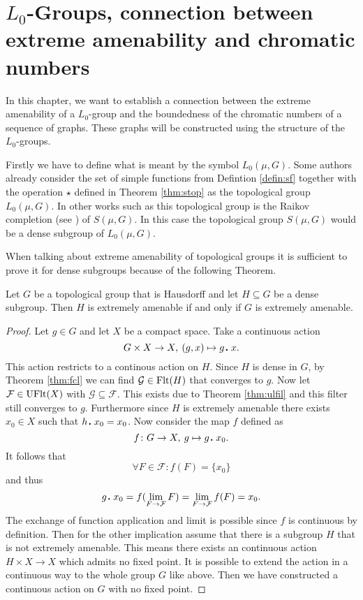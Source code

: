\section{$L_0$-Groups, connection between extreme amenability and chromatic numbers}\label{sec:l0groups}
In this chapter, we want to establish a connection between the extreme amenability of a $L_0$-group and the boundedness of the chromatic numbers of a sequence of graphs.
These graphs will be constructed using the structure of the $L_0$-groups.

Firstly we have to define what is meant by the symbol $L_0(\mu, G)$. Some authors already consider the set of simple functions from Defintion \ref{defin:sf} together with the operation $\star$ defined in Theorem \ref{thm:stop} as the topological group $L_0(\mu, G)$. In other works such as \cite{sl2024} this topological group is the Raikov completion (see \cite[Chapter 3.6]{atop2008}) of $S(\mu, G)$. In this case the topological group $S(\mu, G)$ would be a dense subgroup of $L_0(\mu, G)$.   

When talking about extreme amenability of topological groups it is sufficient to prove it for dense subgroups because of the following Theorem. 
\begin{thm}\label{thm:da}
  Let $G$ be a topological group that is Hausdorff and let $H \subseteq G$ be a dense subgroup. Then $H$ is extremely amenable if and only if $G$ is extremely amenable. 
\end{thm}

\begin{proof}
  Let $g \in G$ and let $X$ be a compact space. Take a continuous action \[G \times X \to X, \: (g, x) \mapsto g \anddot x.\] This action restricts to a continous action on $H$. Since $H$ is dense in $G$, by Theorem \ref{thm:fcl} we can find $\mathcal{G} \in {\rm Flt}(H)$ that converges to $g$. Now let $\mathcal{F} \in {\rm UFlt}(X)$ with $\mathcal{G} \subseteq \mathcal{F}$. This exists due to Theorem \ref{thm:ulfil} and this filter still converges to $g$. Furthermore since $H$ is extremely amenable there exists $x_0 \in X$ such that $h \anddot x_0 = x_0$. Now consider the map $f$ defined as \[f\colon G \to X, \: g \mapsto g\anddot x_0.\] It follows that \[\forall F\in \mathcal{F}\colon f(F) = \{x_0\}\] and thus \[g\anddot x_0 = f(\lim\limits_{F \to \mathcal{F}}F) = \lim\limits_{F\to \mathcal{F}} f(F) = x_0.\] The exchange of function application and limit is possible since $f$ is continuous by definition.
  Then for the other implication assume that there is a subgroup $H$ that is not extremely amenable. This means there exists an continuous action $H \times X \to X$ which admits no fixed point. It is possible to extend the action in a continuous way to the whole group $G$ like above. Then we have constructed a continuous action on $G$ with no fixed point.
\end{proof}

